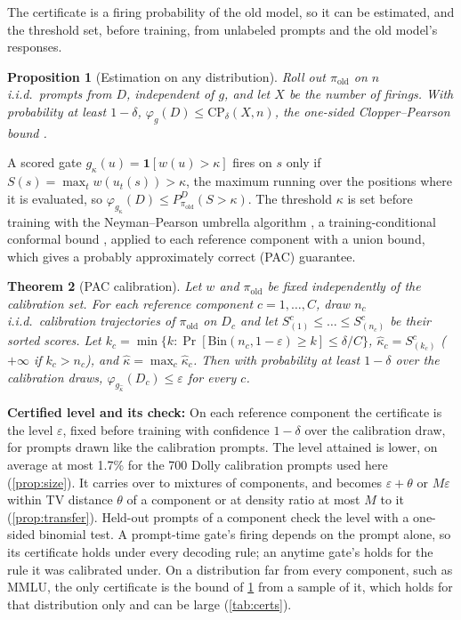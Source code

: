 \documentclass{article}
\theoremstyle{plain}
\newtheorem{theorem}{Theorem}[section]
\newtheorem{proposition}[theorem]{Proposition}
\theoremstyle{definition}
\theoremstyle{remark}
\newcommand{\pold}{\pi_{\mathrm{old}}}
\newcommand{\ind}{\mathbf{1}}
\begin{document}
The certificate is a firing probability of the old model, so it can be estimated, and the threshold set, before
training, from unlabeled prompts and the old model's responses.

\begin{proposition}[Estimation on any distribution]
\label{prop:cp}
Roll out $\pold$ on $n$ i.i.d.\ prompts from $D$, independent of $g$, and let $X$ be the number of firings. With probability at least
$1-\delta$, $\varphi_g(D)\le\mathrm{CP}_{\delta}(X,n)$, the one-sided Clopper--Pearson bound \citep{clopper1934}.
\end{proposition}

A scored gate $g_\kappa(u)=\ind[w(u)>\kappa]$ fires on $s$ only if $S(s)=\max_{t}w(u_t(s))>\kappa$, the maximum
running over the positions where it is evaluated, so $\varphi_{g_\kappa}(D)\le P^D_{\pold}(S>\kappa)$. The threshold $\kappa$ is set
before training with the Neyman--Pearson umbrella algorithm \citep{tong2018np}, a training-conditional conformal bound
\citep{vovk2012conditional,bates2021rcps}, applied to each reference component with a union bound, which gives a
probably approximately correct (PAC) guarantee.

\begin{theorem}[PAC calibration]
\label{thm:calib}
Let $w$ and $\pold$ be fixed independently of the calibration set. For each reference component $c=1,\dots,C$,
draw $n_c$ i.i.d.\ calibration trajectories of $\pold$ on $D_c$ and let $S^c_{(1)}\le\dots\le S^c_{(n_c)}$ be their sorted
scores. Let $k_c=\min\{k:\Pr[\mathrm{Bin}(n_c,1-\varepsilon)\ge k]\le\delta/C\}$, $\hat\kappa_c=S^c_{(k_c)}$
($+\infty$ if $k_c>n_c$), and $\hat\kappa=\max_c\hat\kappa_c$. Then with probability at least $1-\delta$ over the
calibration draws, $\varphi_{g_{\hat\kappa}}(D_c)\le\varepsilon$ for every $c$.
\end{theorem}

\textbf{Certified level and its check:} On each reference component the certificate is the level $\varepsilon$, fixed
before training with confidence $1-\delta$ over the calibration draw, for prompts drawn like the calibration prompts.
The level attained is lower, on average at most 1.7\% for the 700 Dolly calibration prompts used here (\cref{prop:size}).
It carries over to mixtures of components, and becomes $\varepsilon+\theta$ or $M\varepsilon$ within TV distance $\theta$
of a component or at density ratio at most $M$ to it (\cref{prop:transfer}). Held-out prompts of a component check
the level with a one-sided binomial test. A prompt-time gate's firing depends on the prompt alone, so its certificate
holds under every decoding rule; an anytime gate's holds for the rule it was calibrated under. On a distribution far from every component, such as MMLU, the only certificate is the
bound of \cref{prop:cp} from a sample of it, which holds for that distribution only and can be large (\cref{tab:certs}).
\end{document}
